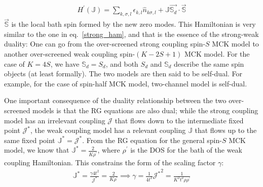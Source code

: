 \documentclass[reprint,prb,superscriptaddress]{revtex4-2}
\begin{document}
\begin{equation}\begin{aligned}
	H^\prime(\mathbb{J}) = \sum_{k,\sigma,l}\epsilon_{k,l} \hat n_{k\sigma,l} + \mathbb{J} \vec{\mathbb{S}_d}\cdot\vec{\mathbb{S}}
\end{aligned}\end{equation}
$\vec{\mathbb{S}}$ is the local bath spin formed by the new zero modes. This Hamiltonian is very similar to the one in eq.~\ref{strong_ham}, and that is the essence of the strong-weak duality: One can go from the over-screened strong coupling spin-\(S\) MCK model to another over-screened weak coupling spin-\((K-2S+1)\) MCK model. For the case of \(K=4S\), we have \(\mathbb{S}_d = S_d\), and both \(S_d\) and \(\mathbb{S}_d\) describe the same spin objects (at least formally). The two models are then said to be self-dual. For example, for the case of spin-half MCK model, two-channel model is self-dual.

One important consequence of the duality relationship between the two over-screened models is that the RG equations are also dual; while the strong coupling model has an irrelevant coupling \(\mathcal{J}\) that flows down to the intermediate fixed point \({\mathcal{J}^*}\), the weak coupling model has a relevant coupling \(\mathbb{J}\) that flows up to the same fixed point \({\mathbb{J}}^* = {\mathcal{J}^*}\). From the RG equation for the general spin-\(S\) MCK model, we know that \({\mathbb{J}}^* = \frac{2}{K \rho^\prime}\), where \(\rho^\prime\) is the DOS for the bath of the weak coupling Hamiltonian. This constrains the form of the scaling factor \(\gamma\):
\begin{equation}\begin{aligned}
	{\mathbb{J}}^* = \frac{\gamma 4t^2}{{\mathcal{J}^*}} = \frac{2}{K \rho^\prime} \implies \gamma = \frac{1}{4t^2} {{\mathcal{J}^*}}^2 = \frac{1}{K^2 t^2 \rho \rho^\prime}
\end{aligned}\end{equation}
\end{document}
